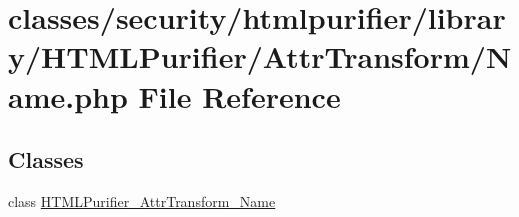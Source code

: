 \hypertarget{AttrTransform_2Name_8php}{\section{classes/security/htmlpurifier/library/\+H\+T\+M\+L\+Purifier/\+Attr\+Transform/\+Name.php File Reference}
\label{AttrTransform_2Name_8php}
}
\subsection*{Classes}
\begin{DoxyCompactItemize}
\item 
class \hyperlink{classHTMLPurifier__AttrTransform__Name}{H\+T\+M\+L\+Purifier\+\_\+\+Attr\+Transform\+\_\+\+Name}
\end{DoxyCompactItemize}

